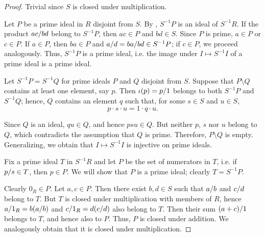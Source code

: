 \begin{proof}
   Trivial since \( S \) is closed under multiplication.

   Let \( P \) be a prime ideal in \( R \) disjoint from \( S \). By , \( S^{-1} P \) is an ideal of \( S^{-1} R \). If the product \( ac / bd \) belong to \( S^{-1} P \), then \( ac \in P \) and \( bd \in S \). Since \( P \) is prime, \( a \in P \) or \( c \in P \). If \( a \in P \), then \( ba \in P \) and \( a / d = ba / bd \in S^{-1} P \); if \( c \in P \), we proceed analogously. Thus, \( S^{-1} P \) is a prime ideal, i.e. the image under \( I \mapsto S^{-1} I \) of a prime ideal is a prime ideal.

   Let \( S^{-1} P = S^{-1} Q \) for prime ideals \( P \) and \( Q \) disjoint from \( S \). Suppose that \( P \setminus Q \) contains at least one element, say \( p \). Then \( \iota(p) = p / 1 \) belongs to both \( S^{-1} P \) and \( S^{-1} Q \); hence, \( Q \) contains an element \( q \) such that, for some \( s \in S \) and \( u \in S \),
  \begin{equation*}
    p \cdot s \cdot u = 1 \cdot q \cdot u.
  \end{equation*}

  Since \( Q \) is an ideal, \( qu \in Q \), and hence \( psu \in Q \). But neither \( p \), \( s \) nor \( u \) belong to \( Q \), which contradicts the assumption that \( Q \) is prime. Therefore, \( P \setminus Q \) is empty. Generalizing, we obtain that \( I \mapsto S^{-1} I \) is injective on prime ideals.

   Fix a prime ideal \( T \) in \( S^{-1} R \) and let \( P \) be the set of numerators in \( T \), i.e. if \( p / s \in T \), then \( p \in P \). We will show that \( P \) is a prime ideal; clearly \( T = S^{-1} P \).

  Clearly \( 0_R \in P \). Let \( a, c \in P \). Then there exist \( b, d \in S \) such that \( a / b \) and \( c / d \) belong to \( T \). But \( T \) is closed under multiplication with members of \( R \), hence \( a / 1_R = b (a / b) \) and \( c / 1_R = d (c / d) \) also belong to \( T \). Then their sum \( (a + c) / 1 \) belongs to \( T \), and hence also to \( P \). Thus, \( P \) is closed under addition. We analogously obtain that it is closed under multiplication.


\end{proof}
